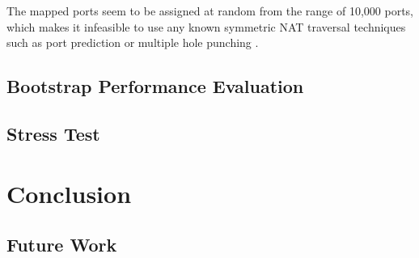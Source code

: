 The mapped ports seem to be assigned at random from the range of 10,000 ports, which makes it infeasible to use any known symmetric NAT traversal techniques such as port prediction or multiple hole punching \cite{multihole}\cite{takeda}.

\section{Bootstrap Performance Evaluation}

\section{Stress Test}



\chapter{Conclusion}

\section{Future Work}
